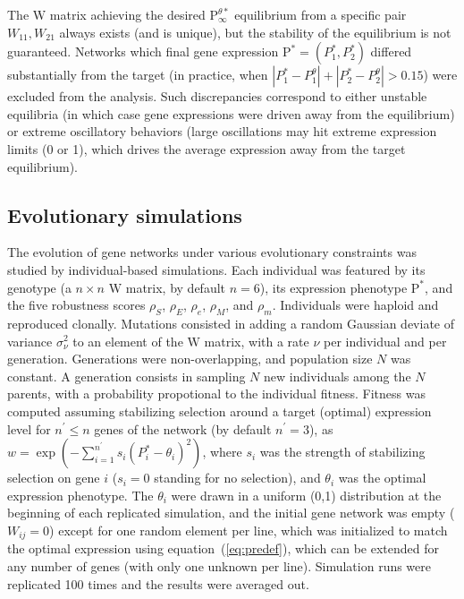 \documentclass[10pt,a4paper]{article}
\newcommand{\stability}{{\rho_S}}
\newcommand{\earlyenv}{{\rho_E}}
\newcommand{\lateenv}{{\rho_e}}
\newcommand{\earlymut}{{\rho_M}}
\newcommand{\latemut}{{\rho_m}}
\newcommand{\W}{\bm{\mathrm W}}
\newcommand{\Pp}{\bm{\mathrm P}}
\begin{document}
The $\W$ matrix achieving the desired $\Pp^{\theta \ast}_\infty$ equilibrium from a specific pair $W_{11}, W_{21}$ always exists (and is unique), but the stability of the equilibrium is not guaranteed. Networks which final gene expression $\Pp^\ast = (P^\ast_1,P^\ast_2)$ differed substantially from the target (in practice, when $|P^\ast_1 - P^{\theta}_1| + |P^\ast_2 - P^{\theta}_2| > 0.15$) were excluded from the analysis. Such discrepancies correspond to either unstable equilibria (in which case gene expressions were driven away from the equilibrium) or extreme oscillatory behaviors (large oscillations may hit extreme expression limits (0 or 1), which drives the average expression away from the target equilibrium). 

\subsection{Evolutionary simulations}

The evolution of gene networks under various evolutionary constraints was studied by individual-based simulations. Each individual was featured by its genotype (a $n \times n$ $\W$ matrix, by default $n=6$), its expression phenotype $\Pp^*$, and the five robustness scores $\stability$, $\earlyenv$, $\lateenv$, $\earlymut$, and $\latemut$. Individuals were haploid and reproduced clonally. Mutations consisted in adding a random Gaussian deviate of variance $\sigma_\nu^2$ to an element of the $\W$ matrix, with a rate $\nu$ per individual and per generation. Generations were non-overlapping, and population size $N$ was constant. A generation consists in sampling $N$ new individuals among the $N$ parents, with a probability propotional to the individual fitness. Fitness was computed assuming stabilizing selection around a target (optimal) expression level for $n^\prime \leq n$ genes of the network (by default $n^\prime=3$), as $w = \exp(- \sum_{i=1}^{n^\prime} s_i (P_i^* - \theta_i)^2 )$, where $s_i$ was the strength of stabilizing selection on gene $i$ ($s_i = 0$ standing for no selection), and $\theta_i$ was the optimal expression phenotype. The $\theta_i$ were drawn in a uniform (0,1) distribution at the beginning of each replicated simulation, and the initial gene network was empty ($W_{ij} = 0$) except for one random element per line, which was initialized to match the optimal expression using equation~(\ref{eq:predef}), which can be extended for any number of genes (with only one unknown per line). Simulation runs were replicated 100 times and the results were averaged out. 
\end{document}
